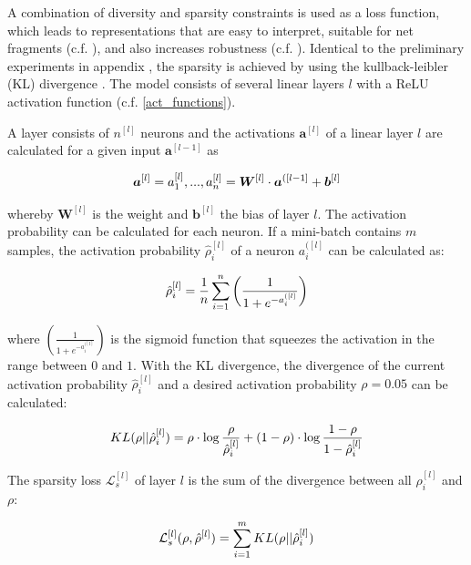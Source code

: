 A combination of diversity and sparsity constraints is used as a loss function, which leads to representations that are easy to interpret, suitable for net fragments (c.f. ), and also increases robustness (c.f. ).
Identical to the preliminary experiments in appendix , the sparsity is achieved by using the kullback-leibler (KL) divergence .
The model consists of several linear layers $l$ with a ReLU activation function (c.f. \eqref{act_functions}).

A layer consists of $n^{[l]}$ neurons and the activations $\boldsymbol{a}^{[l]}$ of a linear layer $l$ are calculated for a given input $\boldsymbol{a}^{[l-1]}$ as

\begin{equation}\eqlbl{vso_1}
		\boldsymbol{a}^{[l]} = a^{[l]}_1, ..., a^{[l]}_n = \boldsymbol{W}^{[l]} \cdot \boldsymbol{a}^{([l-1]} + \boldsymbol{b}^{[l]}
\end{equation}

whereby $\boldsymbol{W}^{[l]}$ is the weight and $\boldsymbol{b}^{[l]}$ the bias of layer $l$.
The activation probability can be calculated for each neuron. If a mini-batch contains $m$ samples, the activation probability $\hat{\rho}^{[l]}_i$ of a neuron $a^{([l]}_i$ can be calculated as:

\begin{equation}\eqlbl{vso_2}
		\hat{\rho}^{[l]}_i= \frac{1}{n} \sum^n_{i=1} \left( \frac{1}{1+e^{-a^{([l]}_i}} \right)
\end{equation}

where $\left( \frac{1}{1+e^{-a^{([l]}_i}} \right)$ is the sigmoid function that squeezes the activation in the range between $0$ and $1$.
With the KL divergence, the divergence of the current activation probability $\hat{\rho}^{[l]}_i$ and a desired activation probability $\rho=0.05$ can be calculated:

\begin{equation}\eqlbl{vso_3}
		KL(\rho || \hat{\rho}^{[l]}_i) = \rho \cdot \log \frac{\rho}{\hat{\rho}^{[l]}_i} + (1-\rho) \cdot \log \frac{1-\rho}{1-\hat{\rho}^{[l]}_i}
\end{equation}

The sparsity loss $\mathcal{L}^{[l]}_{s}$ of layer $l$ is the sum of the divergence between all $\hat{\rho}^{[l]}_i$ and $\rho$:

\begin{equation}\eqlbl{vso_4}
		\mathcal{L}^{[l]}_{s}(\rho, \hat{\rho}^{[l]}) = \sum_{i=1}^{m} KL(\rho || \hat{\rho}^{[l]}_i)
\end{equation}


